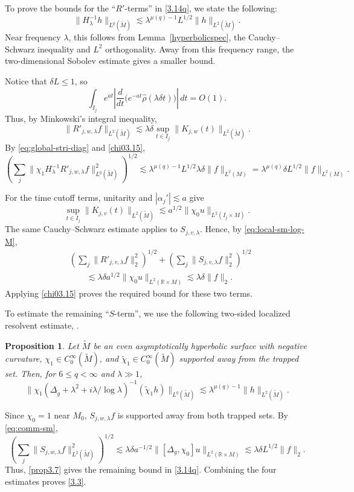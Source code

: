 \documentclass[11pt]{amsart}
\newcommand{\la}{\lambda}
\newtheorem{proposition}{Proposition}[section]
\begin{document}
To prove the bounds for the ``$R'$-terms'' in \eqref{3.14q}, we state the following:
\begin{equation}\label{chi03.15}
\|H_\la^{-1}h\|_{L^q(\tilde M)}
\lesssim\la^{\mu(q)-1}L^{1/2}\|h\|_{L^2(\tilde M)}.
\end{equation}
Near frequency $\la$, this follows from Lemma~\ref{hyperbolicspec}, the Cauchy--Schwarz inequality and $L^2$ orthogonality. Away from this frequency range, the two-dimensional Sobolev estimate gives a smaller bound.

Notice that $\delta L\leq1$, so
\[
\int_{I_j}e^{at}\left|\frac{d}{dt}\bigl(e^{-at}\widehat\rho(\la\delta t)\bigr)\right|\,dt=O(1).
\]
Thus, by Minkowski's integral inequality,
\[
\|R'_{j,w,\la}f\|_{L^2(\tilde M)}
\lesssim\la\delta\sup_{t\in I_j}\|K_{j,w}(t)\|_{L^2(\tilde M)}.
\]
By \eqref{eq:global-stri-diag} and \eqref{chi03.15},
\[
\left(\sum_j\|\chi_1H_\la^{-1}R'_{j,w,\la}f\|_{L^q(\tilde M)}^2\right)^{1/2}
\lesssim\la^{\mu(q)-1}L^{1/2}\la\delta\|f\|_{L^2(M)}
=\la^{\mu(q)}\delta L^{1/2}\|f\|_{L^2(M)}.
\]

For the time cutoff terms, unitarity and $|\alpha_j'|\lesssim a$ give
\[
\sup_{t\in I_j}\|K_{j,v}(t)\|_{L^2(\tilde M)}
\lesssim a^{1/2}\|\chi_0u\|_{L^2(I_j\times M)}.
\]
The same Cauchy--Schwarz estimate applies to $S_{j,v,\la}$. Hence, by \eqref{eq:local-sm-log-M},
\begin{equation}\label{eq:core-time-terms}
\begin{split}
&\left(\sum_j\|R'_{j,v,\la}f\|_2^2\right)^{1/2}
+\left(\sum_j\|S_{j,v,\la}f\|_2^2\right)^{1/2}\\
&\qquad\lesssim\la\delta a^{1/2}\|\chi_0u\|_{L^2(\mathbb R\times M)}
\lesssim\la\delta\|f\|_2.
\end{split}
\end{equation}
Applying \eqref{chi03.15} proves the required bound for these two terms.

To estimate the remaining ``$S$-term'', we use the following two-sided localized resolvent estimate, \cite[Proposition 2.8]{HSTZ}.
\begin{proposition}\label{keyb}
Let $\tilde M$ be an even asymptotically hyperbolic surface with negative curvature, $\chi_1\in C_0^\infty(\tilde M)$, and $\tilde\chi_1\in C_0^\infty(\tilde M)$ supported away from the trapped set. Then, for $6\leq q<\infty$ and $\la\gg1$,
\begin{equation}\label{prop3.7}
\|\chi_1(\Delta_{\tilde g}+\la^2+i\la/\log\la)^{-1}(\tilde\chi_1h)\|_{L^q(\tilde M)}
\lesssim\la^{\mu(q)-1}\|h\|_{L^2(\tilde M)}.
\end{equation}
\end{proposition}
Since $\chi_0=1$ near $M_0$, $S_{j,w,\la}f$ is supported away from both trapped sets. By \eqref{eq:comm-sm},
\[
\left(\sum_j\|S_{j,w,\la}f\|_{L^2(\tilde M)}^2\right)^{1/2}
\lesssim\la\delta a^{-1/2}\|[\Delta_g,\chi_0]u\|_{L^2(\mathbb R\times M)}
\lesssim\la\delta L^{1/2}\|f\|_2.
\]
Thus, \eqref{prop3.7} gives the remaining bound in \eqref{3.14q}. Combining the four estimates proves \eqref{3.3}.
\end{document}
